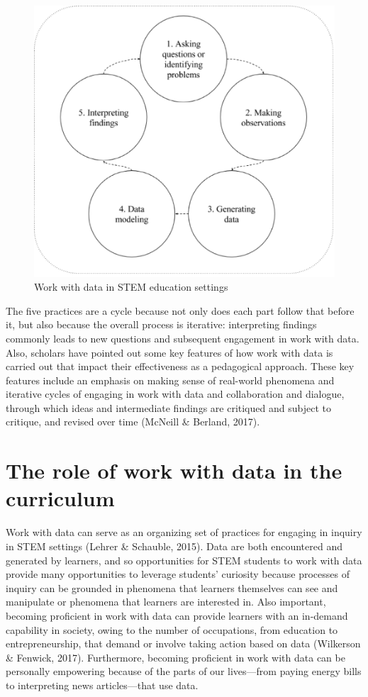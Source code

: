 \documentclass[]{msu-thesis}
\theoremstyle{definition}
\theoremstyle{definition}
\theoremstyle{definition}
\theoremstyle{remark}
\begin{document}
\begin{figure}

{\centering \includegraphics[width=0.8\linewidth]{images/figure1} 

}

\caption{Work with data in STEM education settings}\label{fig:unnamed-chunk-1}
\end{figure}

The five practices are a cycle because not only does each part follow
that before it, but also because the overall process is iterative:
interpreting findings commonly leads to new questions and subsequent
engagement in work with data. Also, scholars have pointed out some key
features of how work with data is carried out that impact their
effectiveness as a pedagogical approach. These key features include an
emphasis on making sense of real-world phenomena and iterative cycles of
engaging in work with data and collaboration and dialogue, through which
ideas and intermediate findings are critiqued and subject to critique,
and revised over time (McNeill \& Berland, 2017).

\section{The role of work with data in the
curriculum}\label{the-role-of-work-with-data-in-the-curriculum}

Work with data can serve as an organizing set of practices for engaging
in inquiry in STEM settings (Lehrer \& Schauble, 2015). Data are both
encountered and generated by learners, and so opportunities for STEM
students to work with data provide many opportunities to leverage
students' curiosity because processes of inquiry can be grounded in
phenomena that learners themselves can see and manipulate or phenomena
that learners are interested in. Also important, becoming proficient in
work with data can provide learners with an in-demand capability in
society, owing to the number of occupations, from education to
entrepreneurship, that demand or involve taking action based on data
(Wilkerson \& Fenwick, 2017). Furthermore, becoming proficient in work
with data can be personally empowering because of the parts of our
lives---from paying energy bills to interpreting news articles---that
use data.
\end{document}
